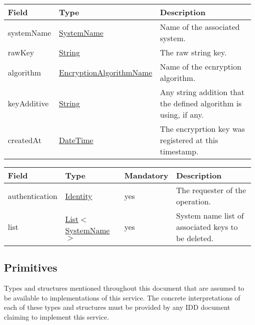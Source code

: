 \documentclass[a4paper]{arrowhead}
\newcommand{\pref}[1]{{\textcolor{ArrowheadGrey}{\hyperref[sec:model:primitives:#1]{#1}}}}
\begin{document}

\begin{table}[ht!]
\begin{tabularx}{\textwidth}{| p{4.25cm} | p{4.5cm} | X |} \hline
\rowcolor{gray!33} Field & Type & Description \\ \hline
systemName & \pref{SystemName} & Name of the associated system. \\ \hline
rawKey & \pref{String} & The raw string key. \\ \hline
algorithm & \pref{EncryptionAlgorithmName} & Name of the ecnryption algorithm. \\ \hline
keyAdditive & \pref{String} & Any string addition that the defined algorithm is using, if any. \\ \hline
createdAt & \pref{DateTime} & The encryprtion key was registered at this timestamp. \\ \hline
\end{tabularx}
\end{table}


\begin{table}[ht!]
\begin{tabularx}{\textwidth}{| p{2.5cm} | p{4cm} | p{2cm} | X |} \hline
\rowcolor{gray!33} Field & Type & Mandatory & Description \\ \hline
authentication & \hyperref[sec:model:Identity]{Identity} & yes & The requester of the operation. \\ \hline
list & \pref{List}$<$\pref{SystemName}$>$ & yes & System name list of associated keys to be deleted. \\ \hline
\end{tabularx}
\end{table}

\newpage

\subsection{Primitives}
\label{sec:model:primitives}

Types and structures mentioned throughout this document that are assumed to be available to implementations of this service.
The concrete interpretations of each of these types and structures must be provided by any IDD document claiming to implement this service.
\end{document}

